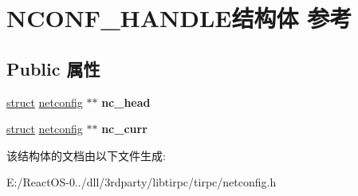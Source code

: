 \hypertarget{struct_n_c_o_n_f___h_a_n_d_l_e}{}\section{N\+C\+O\+N\+F\+\_\+\+H\+A\+N\+D\+L\+E结构体 参考}
\label{struct_n_c_o_n_f___h_a_n_d_l_e}
\subsection*{Public 属性}
\begin{DoxyCompactItemize}
\item 
\mbox{\label{struct_n_c_o_n_f___h_a_n_d_l_e_acc95c551fe5ad012d87e4afc1ab7dd60}} 
\hyperlink{interfacestruct}{struct} \hyperlink{structnetconfig}{netconfig} $\ast$$\ast$ {\bfseries nc\+\_\+head}
\item 
\mbox{\label{struct_n_c_o_n_f___h_a_n_d_l_e_adda84878994395a03a582232d6b4570c}} 
\hyperlink{interfacestruct}{struct} \hyperlink{structnetconfig}{netconfig} $\ast$$\ast$ {\bfseries nc\+\_\+curr}
\end{DoxyCompactItemize}


该结构体的文档由以下文件生成\+:\begin{DoxyCompactItemize}
\item 
E\+:/\+React\+O\+S-\/0../dll/3rdparty/libtirpc/tirpc/netconfig.\+h\end{DoxyCompactItemize}
